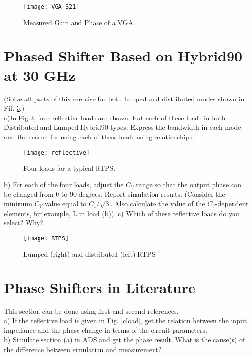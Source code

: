 \documentclass[paper=a4, fontsize=11pt]{scrartcl} %
\numberwithin{equation}{section} %
\numberwithin{figure}{section} %
\numberwithin{table}{section} %
\begin{document}
\begin{figure}[h]
\centering
\texttt{[image: VGA\_S21]}
\caption{Measured Gain and Phase of a VGA.}\label{vga}
\end{figure}

\section{Phased Shifter Based on Hybrid90 at 30 GHz}
(Solve all parts of this exercise for both lumped and distributed modes shown in Fif. \ref{LD}.)\\

a)In Fig.\ref{loads}, four reflective loads are shown. Put each of these loads in both Distributed and Lumped Hybrid90 types. Express the bandwidth in each mode and the reason for using each of these loads using relationships.\\

\begin{figure}[h]
\centering
\texttt{[image: reflective]}\label{loads}
\caption{Four loads for a typical RTPS.}
\end{figure}


b) For each of the four loads, adjust the $C_V$ range so that the output phase can be changed from 0 to 90 degrees. Report simulation results. (Consider the minimum $C_V$ value equal to $C_1/\sqrt{3}$. Also calculate the value of the $C_V$-dependent elements, for example, L in load (b)).
c) Which of these reflective loads do you select? Why?\\

\begin{figure}[h]
\centering
\texttt{[image: RTPS]}\label{LD}
\caption{Lumped (right) and distributed (left) RTPS}
\end{figure}

\section{Phase Shifters in Literature}
This section can be done using first and second references.\\

a) If the reflective load is given in Fig. \ref{cload}, get the relation between the input impedance and the phase change in terms of the circuit parameters.\\

b) Simulate section (a) in ADS and get the phase result. What is the cause(s) of the difference between simulation and measurement?\\
\end{document}
